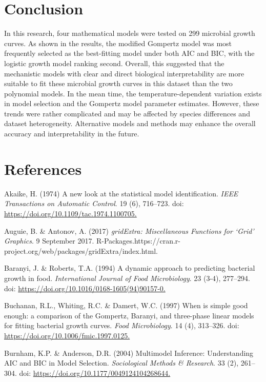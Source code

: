 \documentclass[11pt]{article}
\begin{document}
\section{Conclusion}
In this research, four mathematical models were tested on 299 microbial growth curves. As shown in the results, the modified Gompertz model was  most frequently selected as the best-fitting model under both AIC and BIC, with the logistic growth model ranking second. Overall, this suggested that the mechanistic models with clear and direct biological interpretability are more suitable to fit these microbial growth curves in this dataset than the two polynomial models. In the mean time, the temperature-dependent variation exists in model selection and the Gompertz model parameter estimates. However, these trends were rather complicated and may be affected by species differences and dataset heterogeneity. Alternative models and methods may enhance the overall accuracy and interpretability in the future.

\newpage
\nolinenumbers
\section{References}
\setlength{\parindent}{0pt}
\setlength{\parskip}{1.0em}
Akaike, H. (1974) A new look at the statistical model identification. \textit{IEEE Transactions on Automatic Control}. 19 (6), 716–723. doi: \url{https://doi.org/10.1109/tac.1974.1100705.}

 Auguie, B. \& Antonov, A. (2017) \textit{gridExtra: Miscellaneous Functions for ‘Grid’ Graphics}. 9 September 2017. R-Packages.{https://cran.r-project.org/web/packages/gridExtra/index.html}.

 Baranyi, J. \& Roberts, T.A. (1994) A dynamic approach to predicting bacterial growth in food. \textit{International Journal of Food Microbiology}. 23 (3-4), 277–294. doi: \url{https://doi.org/10.1016/0168-1605(94)90157-0.}

 Buchanan, R.L., Whiting, R.C. \& Damert, W.C. (1997) When is simple good enough: a comparison of the Gompertz, Baranyi, and three-phase linear models for fitting bacterial growth curves. \textit{Food Microbiology}. 14 (4), 313–326. doi: \url{https://doi.org/10.1006/fmic.1997.0125.}

 Burnham, K.P. \& Anderson, D.R. (2004) Multimodel Inference: Understanding AIC and BIC in Model Selection. \textit{Sociological Methods \& Research}. 33 (2), 261–304. doi: \url{https://doi.org/10.1177/0049124104268644.}
\end{document}
